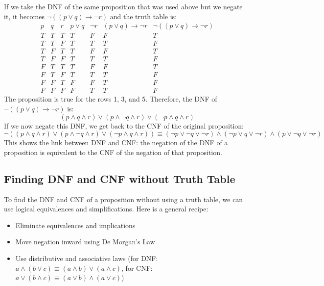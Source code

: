 \begin{eg}
    If we take the DNF of the same proposition that was used above but we negate it, it becomes $\neg ((p \lor q) \to \neg r)$ and the truth table is:
    \[
        \begin{array}{c|c|c|c|c|c|c}
            p & q & r & p \lor q & \neg r & (p \lor q) \to \neg r & \neg ((p \lor q) \to \neg r) \\
            \hline
            T & T & T & T & F & F & T \\
            T & T & F & T & T & T & F \\
            T & F & T & T & F & F & T \\
            T & F & F & T & T & T & F \\
            F & T & T & T & F & F & T \\
            F & T & F & T & T & T & F \\
            F & F & T & F & F & T & F \\
            F & F & F & F & T & T & F
        \end{array}
    \]
    The proposition is true for the rows 1, 3, and 5. Therefore, the DNF of $\neg ((p \lor q) \to \neg r)$ is:
    \[ (p \land q \land r) \lor (p \land \neg q \land r) \lor (\neg p \land q \land r) \]
    If we now negate this DNF, we get back to the CNF of the original proposition:
    \[ \neg ((p \land q \land r) \lor (p \land \neg q \land r) \lor (\neg p \land q \land r)) \equiv (\neg p \lor \neg q \lor \neg r) \land (\neg p \lor q \lor \neg r) \land (p \lor \neg q \lor \neg r) \]
    This shows the link between DNF and CNF: the negation of the DNF of a proposition is equivalent to the CNF of the negation of that proposition.
\end{eg}

\subsection{Finding DNF and CNF without Truth Table}
To find the DNF and CNF of a proposition without using a truth table, we can use logical equivalences and simplifications. Here is a general recipe:
\begin{itemize}[itemsep=1pt,label=$\circ$]
    \item Eliminate equivalences and implications
    \item Move negation inward using De Morgan's Law
    \item Use distributive and associative laws (for DNF: $a \land (b \lor c) \equiv (a \land b) \lor (a \land c)$, for CNF: $a \lor (b \land c) \equiv (a \lor b) \land (a \lor c)$)
\end{itemize}

